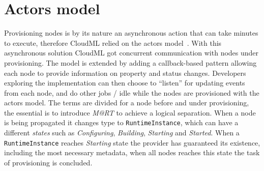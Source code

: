 \section{Actors model}
Provisioning nodes is by its nature an asynchronous action that can take minutes to execute,
therefore CloudML relied on the actors model~\cite{actors:haller07}.
With this asynchronous solution CloudML got concurrent communication with nodes under provisioning.
The model is extended by adding a callback-based pattern allowing each node to provide 
information on property and status changes.
Developers exploring the implementation can then choose to ``listen'' for updating events from each node,
and do other jobs / idle while the nodes are provisioned with the actors model.
The terms are divided for a node before and under provisioning, the essential is to introduce 
\emph{M@RT} to achieve a logical separation.
When a node is being propagated it changes type to \texttt{RuntimeInstance}, 
which can have a different \emph{states} such as \emph{Configuring}, \emph{Building}, \emph{Starting} and \emph{Started}.
When a \texttt{RuntimeInstance} reaches \emph{Starting} state the provider has guaranteed its existence, including
the most necessary metadata, when all nodes reaches this state the task of provisioning is concluded.

